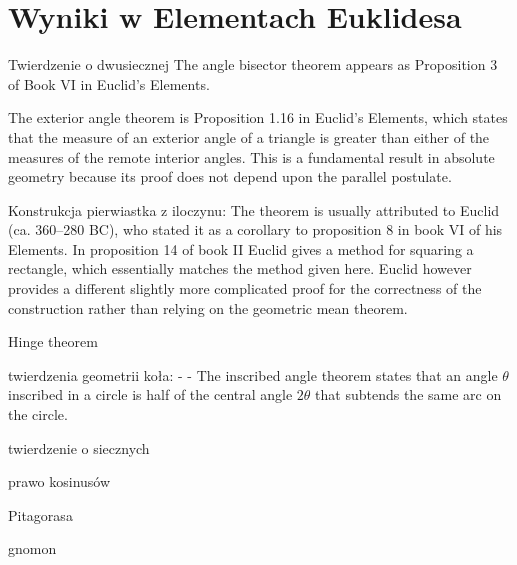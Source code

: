 \documentclass{parchment}
\begin{document}
\section{Wyniki w Elementach Euklidesa}

Twierdzenie o dwusiecznej %
The angle bisector theorem appears as Proposition 3 of Book VI in Euclid's Elements. 

The exterior angle theorem is Proposition 1.16 in Euclid's Elements, which states that the measure of an exterior angle of a triangle is greater than either of the measures of the remote interior angles. This is a fundamental result in absolute geometry because its proof does not depend upon the parallel postulate. %

Konstrukcja pierwiastka z iloczynu:
The theorem is usually attributed to Euclid (ca. 360–280 BC), who stated it as a corollary to proposition 8 in book VI of his Elements. In proposition 14 of book II Euclid gives a method for squaring a rectangle, which essentially matches the method given here. Euclid however provides a different slightly more complicated proof for the correctness of the construction rather than relying on the geometric mean theorem.


Hinge theorem %

twierdzenia geometrii koła:
- %
- The inscribed angle theorem states that an angle $\theta$ inscribed in a circle is half of the central angle $2\theta$ that subtends the same arc on the circle. 



twierdzenie o siecznych

prawo kosinusów

Pitagorasa %

gnomon %
\end{document}
